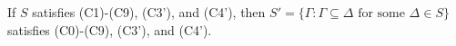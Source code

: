 If $S$ satisfies (C1)-(C9), (C3'), and (C4'), then $S' = \{\Gamma : \Gamma \subseteq \Delta \text{ for some } \Delta \in S\}$ satisfies (C0)-(C9), (C3'), and (C4').
